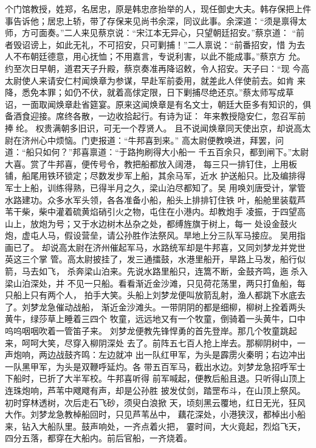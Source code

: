 个门馆教授，姓郑，名居忠，原是韩忠彦抬举的人，现任御史大夫。韩存保把上件
事告诉他；居忠上轿，带了存保来见尚书余深，同议此事。余深道：“须是禀得太
师，方可面奏。”二人来见蔡京说：“宋江本无异心，只望朝廷招安。”蔡京道：
“前者毁诏谤上，如此无礼，不可招安，只可剿捕！”二人禀说：“前番招安，惜
为去人不布朝廷德意，用心抚恤；不用嘉言，专说利害，以此不能成事。”蔡京方
允。约至次日早朝，道君天子升殿，蔡京奏准再降诏敕，令人招安。天子曰：“现
今高太尉使人来请安仁村闻焕章为参谋，早赴军前委用，就差此人伴使前去。如肯
来降，悉免本罪；如仍不伏，就着高俅定限，日下剿捕尽绝还京。”蔡太师写成草
诏，一面取闻焕章赴省筵宴。原来这闻焕章是有名文士，朝廷大臣多有知识的，俱
备酒食迎接。席终各散，一边收拾起行。有诗为证：
年来教授隐安仁，忽召军前捧纶。
权贵满朝多旧识，可无一个荐贤人。
且不说闻焕章同天使出京，却说高太尉在济州心中烦恼。门吏报道：“牛邦喜到来。”
高太尉便教唤进，拜罢，问道：“船只如何？”邦喜禀道：“于路拘刷得大小船一
千五百余只，都到闸下。”太尉大喜。赏了牛邦喜，便传号令，教把船都放入阔港，
每三只一排钉住，上用板铺，船尾用铁环锁定；尽数发步军上船，其余马军，近水
护送船只。比及编排得军士上船，训练得熟，已得半月之久，梁山泊尽都知了。吴
用唤刘唐受计，掌管水路建功。众多水军头领，各各准备小船，船头上排排钉住铁
叶，船舱里装载芦苇干柴，柴中灌着硫黄焰硝引火之物，屯住在小港内。却教炮手
凌振，于四望高山上，放炮为号；又于水边树木丛杂之处，都缚旌旗于树上，每一
处设金鼓火炮，虚屯人马，假设营垒，请公孙胜作法祭风。旱地上分三队军马接应。
吴用指画已了。
却说高太尉在济州催起军马，水路统军却是牛邦喜，又同刘梦龙并党世英这三个掌
管。高太尉披挂了，发三通擂鼓，水港里船开，旱路上马发，船行似箭，马去如飞，
杀奔梁山泊来。先说水路里船只，连篙不断，金鼓齐鸣，迤杀入梁山泊深处，并
不见一只船。看看渐近金沙滩，只见荷花荡里，两只打鱼船，每只船上只有两个人，
拍手大笑。头船上刘梦龙便叫放箭乱射，渔人都跳下水底去了。刘梦龙急催动战船，
渐近金沙滩头。一带阴阴的都是细柳，柳树上拴着两头黄牛，绿莎草上睡着三四个
牧童，远远地又有一个牧童，倒骑着一头黄牛，口中呜呜咽咽吹着一管笛子来。
刘梦龙便教先锋悍勇的首先登岸。那几个牧童跳起来，呵呵大笑，尽穿入柳阴深处
去了。前阵五七百人抢上岸去。那柳阴树中，一声炮响，两边战鼓齐鸣：左边就冲
出一队红甲军，为头是霹雳火秦明；右边冲出一队黑甲军，为头是双鞭呼延灼。各
带五百军马，截出水边。刘梦龙急招呼军士下船时，已折了大半军校。牛邦喜听得
前军喊起，便教后船且退。只听得山顶上连珠炮响，芦苇中飕飕有声，却是公孙胜
披发仗剑，踏罡布斗，在山顶上祭风。初时穿林透树，次后走石飞砂，须臾白浪掀
天，顷刻黑云覆地，红日无光，狂风大作。刘梦龙急教棹船回时，只见芦苇丛中，
藕花深处，小港狭汊，都棹出小船来，钻入大船队里。鼓声响处，一齐点着火把，
霎时间，大火竟起，烈焰飞天，四分五落，都穿在大船内。前后官船，一齐烧着。
